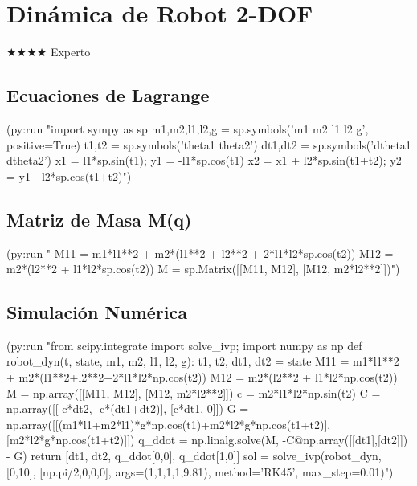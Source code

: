 \chapter{Dinámica de Robot 2-DOF}
\label{chap:robot-dynamics}
{\huge$\bigstar$}{\huge$\bigstar$}{\huge$\bigstar$}{\huge$\bigstar$} Experto

\section{Ecuaciones de Lagrange}
\begin{lispcode}
(py:run "import sympy as sp
m1,m2,l1,l2,g = sp.symbols('m1 m2 l1 l2 g', positive=True)
t1,t2 = sp.symbols('theta1 theta2')
dt1,dt2 = sp.symbols('dtheta1 dtheta2')
x1 = l1*sp.sin(t1); y1 = -l1*sp.cos(t1)
x2 = x1 + l2*sp.sin(t1+t2); y2 = y1 - l2*sp.cos(t1+t2)")
\end{lispcode}

\section{Matriz de Masa M(q)}
\begin{lispcode}
(py:run "
M11 = m1*l1**2 + m2*(l1**2 + l2**2 + 2*l1*l2*sp.cos(t2))
M12 = m2*(l2**2 + l1*l2*sp.cos(t2))
M = sp.Matrix([[M11, M12], [M12, m2*l2**2]])")
\end{lispcode}

\section{Simulación Numérica}
\begin{lispcode}
(py:run "from scipy.integrate import solve_ivp; import numpy as np
def robot_dyn(t, state, m1, m2, l1, l2, g):
    t1, t2, dt1, dt2 = state
    M11 = m1*l1**2 + m2*(l1**2+l2**2+2*l1*l2*np.cos(t2))
    M12 = m2*(l2**2 + l1*l2*np.cos(t2))
    M = np.array([[M11, M12], [M12, m2*l2**2]])
    c = m2*l1*l2*np.sin(t2)
    C = np.array([[-c*dt2, -c*(dt1+dt2)], [c*dt1, 0]])
    G = np.array([[(m1*l1+m2*l1)*g*np.cos(t1)+m2*l2*g*np.cos(t1+t2)],
                  [m2*l2*g*np.cos(t1+t2)]])
    q_ddot = np.linalg.solve(M, -C@np.array([[dt1],[dt2]]) - G)
    return [dt1, dt2, q_ddot[0,0], q_ddot[1,0]]
sol = solve_ivp(robot_dyn, [0,10], [np.pi/2,0,0,0],
                args=(1,1,1,1,9.81), method='RK45', max_step=0.01)")
\end{lispcode}

